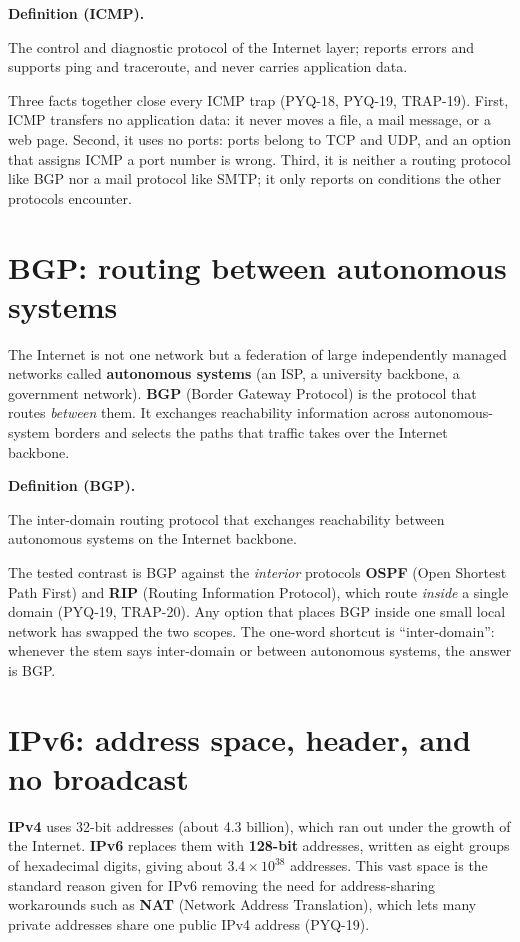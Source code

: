 \documentclass[11pt]{article}
\newenvironment{definitionbox}[1]{%
  \par\noindent\textbf{Definition (#1).}\ \itshape
}{\par\vspace{0.3em}}
\begin{document}
\begin{definitionbox}{ICMP}
The control and diagnostic protocol of the Internet layer; reports errors and
supports ping and traceroute, and never carries application data.
\end{definitionbox}

Three facts together close every ICMP trap (PYQ-18, PYQ-19, TRAP-19). First,
ICMP transfers no application data: it never moves a file, a mail message,
or a web page. Second, it uses no ports: ports belong to TCP and UDP, and an
option that assigns ICMP a port number is wrong. Third, it is neither a
routing protocol like BGP nor a mail protocol like SMTP; it only reports on
conditions the other protocols encounter.

\section{BGP: routing between autonomous systems}
The Internet is not one network but a federation of large independently
managed networks called \textbf{autonomous systems} (an ISP, a university
backbone, a government network). \textbf{BGP} (Border Gateway Protocol) is
the protocol that routes \emph{between} them. It exchanges reachability
information across autonomous-system borders and selects the paths that
traffic takes over the Internet backbone.

\begin{definitionbox}{BGP}
The inter-domain routing protocol that exchanges reachability between
autonomous systems on the Internet backbone.
\end{definitionbox}

The tested contrast is BGP against the \emph{interior} protocols
\textbf{OSPF} (Open Shortest Path First) and \textbf{RIP} (Routing
Information Protocol), which route \emph{inside} a single domain (PYQ-19,
TRAP-20). Any option that places BGP inside one small local network has
swapped the two scopes. The one-word shortcut is ``inter-domain'': whenever
the stem says inter-domain or between autonomous systems, the answer is BGP.

\section{IPv6: address space, header, and no broadcast}
\textbf{IPv4} uses 32-bit addresses (about 4.3 billion), which ran out under
the growth of the Internet. \textbf{IPv6} replaces them with \textbf{128-bit}
addresses, written as eight groups of hexadecimal digits, giving about
$3.4 \times 10^{38}$ addresses. This vast space is the standard reason given
for IPv6 removing the need for address-sharing workarounds such as
\textbf{NAT} (Network Address Translation), which lets many private addresses
share one public IPv4 address (PYQ-19).
\end{document}
